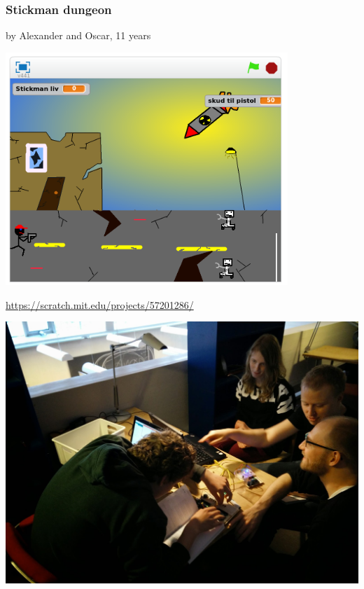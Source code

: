 \documentclass{beamer}
\begin{document}
\begin{frame}
  \frametitle{Stickman dungeon}
  by Alexander and Oscar, 11 years

  \centerline{\includegraphics[width=0.8\textwidth]{imagery/stickman-dungeon}}

  \url{https://scratch.mit.edu/projects/57201286/}
\end{frame}




\begin{frame}
 \vspace{5mm}
 \includegraphics[width=\textwidth]{imagery/arduino-workshop}
\end{frame}
\end{document}
